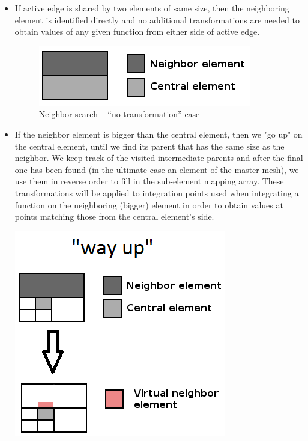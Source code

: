 \begin{itemize}
  \item If active edge is shared by two elements of same size, then the neighboring element is identified directly and 
  no additional transformations are needed to obtain values of any given function from either side of active edge.
\begin{figure}[!h]
  \centering
  \includegraphics[scale=.45]{no_trans}
  \caption{Neighbor search -- ``no transformation'' case}
\end{figure}
  
  \item If the neighbor element is bigger than the central element, then we "go up" on the central element, until we
  find its parent that has the same size as the neighbor. We keep track of the visited intermediate parents and after 
  the final one has been found (in the ultimate case an element of the master
  mesh), we use them in reverse order to fill in the sub-element mapping array. These
  transformations will be applied to integration points used when integrating a function on the neighboring
  (bigger) element in order to obtain values at points matching those from the central element's side.
  
\begin{minipage}{\linewidth}
    \centering
    \includegraphics[scale=.6]{way_up2}
\end{minipage}
  

\end{itemize}
